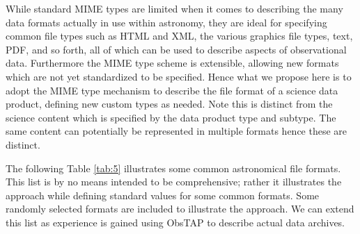 \documentclass[11pt,a4paper]{ivoa}
\begin{document}
While standard MIME types are limited when it comes to describing the many data formats actually in use within
astronomy, they are ideal for specifying common file types such as HTML and XML, the various graphics file types, text,
PDF, and so forth, all of which can be used to describe aspects of observational data.  Furthermore the MIME type
scheme is extensible, allowing new formats which are not yet standardized to be specified.  Hence what we propose here
is to adopt the MIME type mechanism to describe the file format of a science data product, defining new custom types as
needed.  Note this is distinct from the science content which is specified by the data product type and subtype.  The
same content can potentially be represented in multiple formats hence these are distinct.

The following Table \ref{tab:5} illustrates some common astronomical file formats.  This list is by no means intended to be
comprehensive; rather it illustrates the approach while defining standard values for some common formats.  Some
randomly selected formats are included to illustrate the approach.  We can extend this list as experience is gained
using ObsTAP to describe actual data archives.
\end{document}
